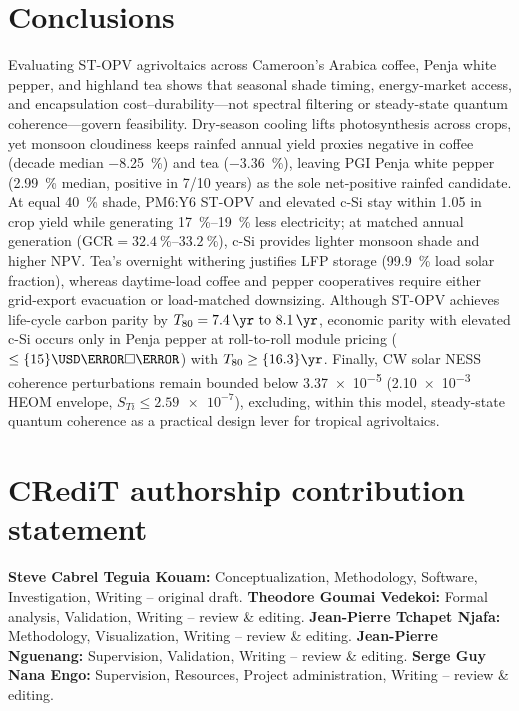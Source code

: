 \documentclass[preprint,12pt,a4paper]{elsarticle}
\begin{document}
\section{Conclusions}
\label{sec:conclusions}

Evaluating ST-OPV agrivoltaics across Cameroon's Arabica coffee, Penja white pepper, and highland tea shows that seasonal shade timing, energy-market access, and encapsulation cost--durability---not spectral filtering or steady-state quantum coherence---govern feasibility. Dry-season cooling lifts photosynthesis across crops, yet monsoon cloudiness keeps rainfed annual yield proxies negative in coffee (decade median \qty{-8.25}{\percent}) and tea (\qty{-3.36}{\percent}), leaving PGI Penja white pepper (\qty{+2.99}{\percent} median, positive in 7/10 years) as the sole net-positive rainfed candidate. At equal \qty{40}{\percent} shade, PM6:Y6 ST-OPV and elevated c-Si stay within \qty{1.05}{\pp} in crop yield while generating \qtyrange{17}{19}{\percent} less electricity; at matched annual generation ($\mathrm{GCR}=\qtyrange{32.4}{33.2}{\percent}$), c-Si provides lighter monsoon shade and higher NPV. Tea's overnight withering justifies LFP storage (\qty{99.9}{\percent} load solar fraction), whereas daytime-load coffee and pepper cooperatives require either grid-export evacuation or load-matched downsizing. Although ST-OPV achieves life-cycle carbon parity by $T_{80}=\qtyrange{7.4}{8.1}{\yr}$, economic parity with elevated c-Si occurs only in Penja pepper at roll-to-roll module pricing ($\le \qty{15}{\USD\per\square\meter}$) with $T_{80}\ge \qty{16.3}{\yr}$. Finally, CW solar NESS coherence perturbations remain bounded below \num{3.37e-5} (\num{2.10e-3} HEOM envelope, $S_{Ti}\le \num{2.59e-7}$), excluding, within this model, steady-state quantum coherence as a practical design lever for tropical agrivoltaics.

\section*{CRediT authorship contribution statement}
\textbf{Steve Cabrel Teguia Kouam:} Conceptualization, Methodology, Software, Investigation, Writing -- original draft. \textbf{Theodore Goumai Vedekoi:} Formal analysis, Validation, Writing -- review \& editing. \textbf{Jean-Pierre Tchapet Njafa:} Methodology, Visualization, Writing -- review \& editing. \textbf{Jean-Pierre Nguenang:} Supervision, Validation, Writing -- review \& editing. \textbf{Serge Guy Nana Engo:} Supervision, Resources, Project administration, Writing -- review \& editing.
\end{document}

